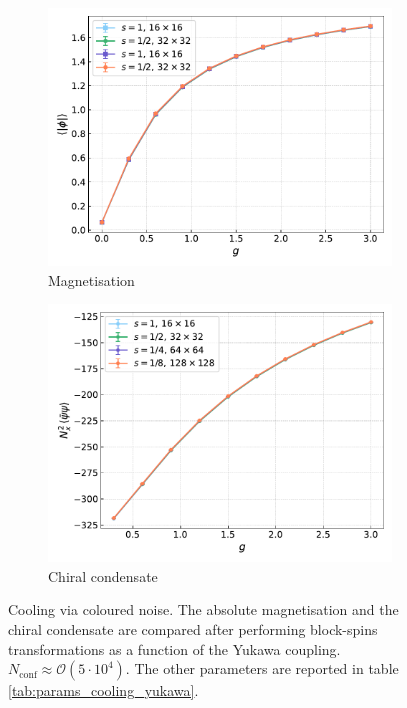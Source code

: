 \begin{figure}[hbp]
    \centering
    \begin{subfigure}[b]{0.48\textwidth}
        \includegraphics[width=1.05\textwidth]{figures/cooling/yukawa_scan/magnetisation.pdf}
        \caption{Magnetisation}
    \end{subfigure}
    \hfill
    \begin{subfigure}[b]{0.48\textwidth}
        \includegraphics[width=1.05\textwidth]{figures/cooling/yukawa_scan/condensate.pdf}
        \caption{Chiral condensate}
    \end{subfigure}
    \caption[Cooling stochastic quantisation: fields as a function of the Yukawa coupling.]{Cooling via coloured noise. The absolute magnetisation and the chiral condensate are compared after performing block-spins transformations as a function of the Yukawa coupling. \\ $N_\text{conf} \approx \mathcal{O}(5 \cdot 10^4)$. The other parameters are reported in table \ref{tab:params_cooling_yukawa}.}
    \label{fig:cooling_M_psibarpsi}
\end{figure}\\
